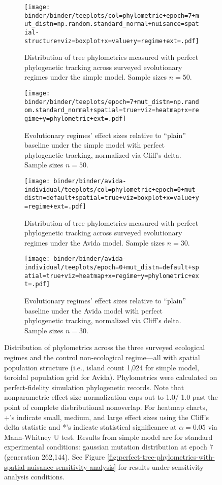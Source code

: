 \begin{figure*}
  \centering
\begin{subfigure}[b]{\textwidth}
  \texttt{[image: binder/binder/teeplots/col=phylometric+epoch=7+mut\_distn=np.random.standard\_normal+nuisance=spatial-structure+viz=boxplot+x=value+y=regime+ext=.pdf]}
  \caption{ Distribution of tree phylometrics measured with perfect phylogenetic tracking across surveyed evolutionary regimes under the simple model.
    Sample sizes $n=50$.}
\end{subfigure}

\begin{subfigure}[b]{\textwidth}
  \texttt{[image: binder/binder/teeplots/epoch=7+mut\_distn=np.random.standard\_normal+spatial=true+viz=heatmap+x=regime+y=phylometric+ext=.pdf]}
  \caption{Evolutionary regimes' effect sizes relative to ``plain'' baseline under the simple model with perfect phylogenetic tracking, normalized via Cliff's delta.
    Sample sizes $n=50$.}
\end{subfigure}

\begin{subfigure}[b]{\textwidth}
  \texttt{[image: binder/binder/avida-individual/teeplots/col=phylometric+epoch=0+mut\_distn=default+spatial=true+viz=boxplot+x=value+y=regime+ext=.pdf]}
  \caption{ Distribution of tree phylometrics measured with perfect phylogenetic tracking across surveyed evolutionary regimes under the Avida model.
  Sample sizes $n=30$.}
\end{subfigure}%

\begin{subfigure}[b]{\textwidth}
  \texttt{[image: binder/binder/avida-individual/teeplots/epoch=0+mut\_distn=default+spatial=true+viz=heatmap+x=regime+y=phylometric+ext=.pdf]}
\caption{%
  Evolutionary regimes' effect sizes relative to ``plain'' baseline under the Avida model with perfect phylogenetic tracking, normalized via Cliff's delta.
    Sample sizes $n=30$.
}
\end{subfigure}
\vspace{1cm}


  \caption{%
    Distribution of phylometrics across the three surveyed ecological regimes and the control non-ecological regime---all with spatial population structure (i.e., island count 1,024 for simple model, toroidal population grid for Avida).
    Phylometrics were calculated on perfect-fidelity simulation phylogenetic records.
    Note that nonparametric effect size normalization caps out to 1.0/-1.0 past the point of complete disbributional nonoverlap.
    For heatmap charts, +'s indicate small, medium, and large effect sizes using the Cliff's delta statistic and *'s indicate statistical significance at $\alpha = 0.05$ via Mann-Whitney U test.
    Results from simple model are for standard experimental conditions: gaussian mutation distribution at epoch 7 (generation 262,144).
    See Figure \ref{fig:perfect-tree-phylometrics-with-spatial-nuisance-sensitivity-analysis} for results under sensitivity analysis conditions.
  }
  \label{fig:perfect-tree-phylometrics-with-spatial-nuisance}
\end{figure*}
